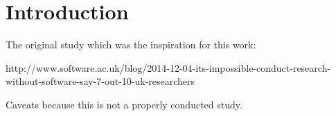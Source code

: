\section{Introduction}

The original study which was the inspiration for this work:

http://www.software.ac.uk/blog/2014-12-04-its-impossible-conduct-research-without-software-say-7-out-10-uk-researchers

Caveats because this is not a properly conducted study.